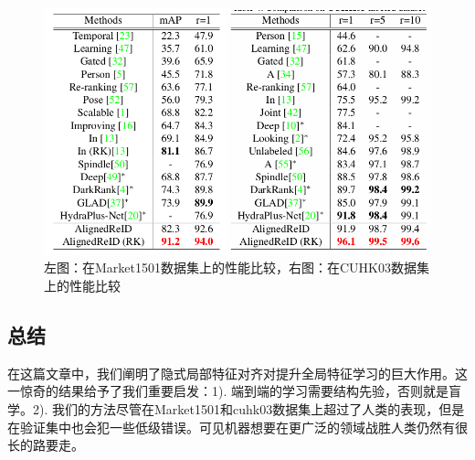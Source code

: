 \begin{figure}
	\centering
	\captionsetup{width=.88\linewidth}
	\includegraphics[width=.85\linewidth,keepaspectratio]{data/waiwenfanyi/compare.png}
	\caption{\kaiti 左图：在Market1501数据集上的性能比较，右图：在CUHK03数据集上的性能比较}
	\label{figure:compare}
\end{figure}

\subsection{总结}
在这篇文章中，我们阐明了隐式局部特征对齐对提升全局特征学习的巨大作用。这一惊奇的结果给予了我们重要启发：1). 端到端的学习需要结构先验，否则就是盲学。2). 我们的方法尽管在Market1501和cuhk03数据集上超过了人类的表现，但是在验证集中也会犯一些低级错误。可见机器想要在更广泛的领域战胜人类仍然有很长的路要走。

